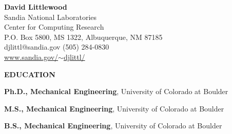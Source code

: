 \documentclass[11pt]{article}
\newlength{\itemskip} \setlength{\itemskip}{0.0in}
\newlength{\sectionskip} \setlength{\sectionskip}{0.2in}
\newlength{\listskip} \setlength{\listskip}{0.05in}
\newlength{\minipagewidth} \setlength{\minipagewidth}{6.25in} %
\begin{document}
\thispagestyle{empty}

\begin{center}
{\LARGE \textbf{David Littlewood}} \\
\vspace{0.1in}
%
Sandia National Laboratories \\
Center for Computing Research \\
P.O. Box 5800, MS 1322, Albuquerque, NM 87185 \\
djlittl@sandia.gov \hspace{.1in} (505) 284-0830 \\
\href{http://www.sandia.gov/~djlittl/}{www.sandia.gov/$\sim$djlittl/} \\
%
\end{center}

\noindent
{\large \textbf{EDUCATION}}
\vspace{\sectionskip}

\begin{minipage}{\minipagewidth}
\textbf{Ph.D., Mechanical Engineering}, University of Colorado at Boulder%
%
\end{minipage}\vspace{\itemskip}

\begin{minipage}{\minipagewidth}
\textbf{M.S., Mechanical Engineering}, University of Colorado at Boulder%
\end{minipage}\vspace{\itemskip}

\begin{minipage}{\minipagewidth}
\textbf{B.S., Mechanical Engineering}, University of Colorado at Boulder%
\end{minipage}
\end{document}
